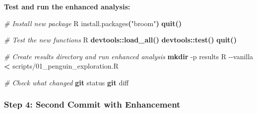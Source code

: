 \documentclass[
]{article}
\newenvironment{Shaded}{\begin{snugshade}}{\end{snugshade}}
\newcommand{\AttributeTok}[1]{\textcolor[rgb]{0.13,0.29,0.53}{#1}}
\newcommand{\CommentTok}[1]{\textcolor[rgb]{0.56,0.35,0.01}{\textit{#1}}}
\newcommand{\DecValTok}[1]{\textcolor[rgb]{0.00,0.00,0.81}{#1}}
\newcommand{\ErrorTok}[1]{\textcolor[rgb]{0.64,0.00,0.00}{\textbf{#1}}}
\newcommand{\ExtensionTok}[1]{#1}
\newcommand{\FunctionTok}[1]{\textcolor[rgb]{0.13,0.29,0.53}{\textbf{#1}}}
\newcommand{\KeywordTok}[1]{\textcolor[rgb]{0.13,0.29,0.53}{\textbf{#1}}}
\newcommand{\NormalTok}[1]{#1}
\newcommand{\OperatorTok}[1]{\textcolor[rgb]{0.81,0.36,0.00}{\textbf{#1}}}
\newcommand{\OtherTok}[1]{\textcolor[rgb]{0.56,0.35,0.01}{#1}}
\newcommand{\SpecialCharTok}[1]{\textcolor[rgb]{0.81,0.36,0.00}{\textbf{#1}}}
\newcommand{\StringTok}[1]{\textcolor[rgb]{0.31,0.60,0.02}{#1}}
\begin{document}
\begin{Shaded}
\end{Shaded}

\textbf{Test and run the enhanced analysis:}

\begin{Shaded}
\begin{Highlighting}[]
\CommentTok{\# Install new package}
\ExtensionTok{R}
\ExtensionTok{install.packages}\ErrorTok{(}\StringTok{"broom"}\KeywordTok{)}
\FunctionTok{quit()}

\CommentTok{\# Test the new functions}
\ExtensionTok{R}
\FunctionTok{devtools::load\_all()}
\FunctionTok{devtools::test()}
\FunctionTok{quit()}

\CommentTok{\# Create results directory and run enhanced analysis}
\FunctionTok{mkdir} \AttributeTok{{-}p}\NormalTok{ results}
\ExtensionTok{R} \AttributeTok{{-}{-}vanilla} \OperatorTok{\textless{}}\NormalTok{ scripts/01\_penguin\_exploration.R}

\CommentTok{\# Check what changed}
\FunctionTok{git}\NormalTok{ status}
\FunctionTok{git}\NormalTok{ diff}
\end{Highlighting}
\end{Shaded}

\subsubsection{Step 4: Second Commit with
Enhancement}\label{step-4-second-commit-with-enhancement}
\end{document}
